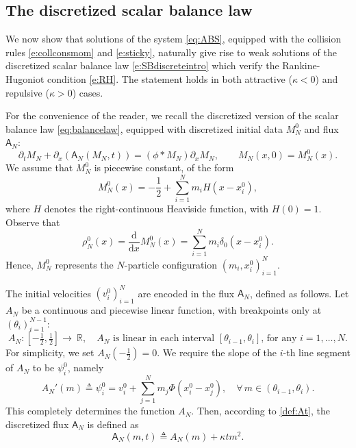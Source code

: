\documentclass[11pt,reqno]{amsart}
\theoremstyle{definition}
\theoremstyle{remark}
\def\R{\mathbb{R}}
\def\dd{\mathrm{d}}
\def\pa{\partial}
\def\A{\mathsf{A}}
\begin{document}
	
	\subsection{The discretized scalar balance law}\label{sec:discrete}
	We now show that solutions of the system \eqref{eq:ABS}, equipped with the collision rules \eqref{e:collconsmom} and \eqref{e:sticky}, naturally give rise to weak solutions of the discretized scalar balance law \eqref{e:SBdiscreteintro} which verify the Rankine-Hugoniot condition \eqref{e:RH}.  The statement holds in both attractive ($\kappa<0$) and repulsive ($\kappa>0$) cases.  
	
	
	
	For the convenience of the reader, we recall the discretized version of the scalar balance law \eqref{eq:balancelaw}, equipped with discretized initial data $M_N^0$ and flux $\A_N$:
	\begin{equation}
		\label{eq:MN}
		\pa_t M_N + \pa_x(\A_N(M_N,t)) = (\phi\ast M_N) \pa_x M_N, \qquad
		M_N(x,0)=M_N^0(x).
	\end{equation}
	We assume that $M_N^0$ is piecewise constant, of the form
	\begin{equation}
		\label{eq:MN0}
		M_N^0(x) = -\frac12 + \sum_{i=1}^{N} m_i H(x - x_i^0),
	\end{equation}
	where $H$ denotes the right-continuous Heaviside function, with $H(0) =1$. Observe that
	\[
	\rho_N^0(x) = \frac{\dd}{\dd x} M_N^0(x) = \sum_{i=1}^{N} m_i \delta_0( x-x_i^0).
	\]
	Hence, $M^0_N$ represents the $N$-particle configuration $(m_i,x_i^0)_{i=1}^N$. 
	
	The initial velocities $(v_i^0)_{i=1}^N$ are encoded in the flux $\A_N$, defined as follows.
	Let $A_N$ be a continuous and piecewise linear function, with breakpoints only at $(\theta_i)_{i=1}^{N-1}$:
	\begin{equation}\label{eq:AN}
		A_N:[-\tfrac12,\tfrac12]\to~\R,\quad
		\text{$A_N$ is linear in each interval $[\theta_{i-1}, \theta_i]$, for any
			$i=1,\ldots,N$.}
	\end{equation}
	For simplicity, we set $A_N(-\frac12)=0$. We require the slope of the $i$-th line segment of $A_N$ to be $\psi_i^0$, namely
	\begin{equation}\label{eq:psi0}
		A_N'(m) \triangleq \psi_i^0 = v_i^0 + \sum_{j=1}^{N} m_j \Phi(x_i^0 - x_j^0),\quad \forall\, m\in(\theta_{i-1}, \theta_i).
	\end{equation}
	This completely determines the function $A_N$. Then, according to \eqref{def:At}, the discretized flux $\A_N$ is defined as
	\begin{equation}\label{def:AN}
		\A_N(m,t) \triangleq A_N(m)+\kappa t m^2. 
	\end{equation}
	
\end{document}
